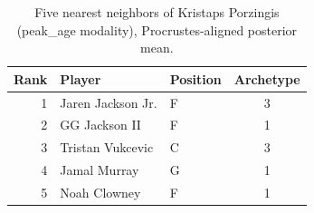 \begin{table}[htbp]
  \centering\small
  \begin{tabular}{rllc}
    \toprule
    Rank & Player & Position & Archetype \\
    \midrule
    1 & Jaren Jackson Jr. & F & 3 \\
    2 & GG Jackson II & F & 1 \\
    3 & Tristan Vukcevic & C & 3 \\
    4 & Jamal Murray & G & 1 \\
    5 & Noah Clowney & F & 1 \\
    \bottomrule
  \end{tabular}
  \caption{Five nearest neighbors of Kristaps Porzingis (peak_age modality), Procrustes-aligned posterior mean.}
  \label{tab:Kristaps_Porzingis_neighbors_peak_age}
\end{table}

